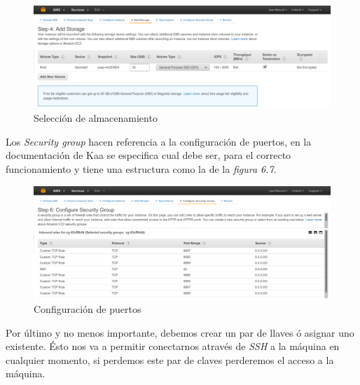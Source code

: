 \begin{figure}[!ht]
  \begin{center}
    \includegraphics[scale=0.30]{../images/kaa/5.png}
		\caption{Selección de almacenamiento}
    \label{fig:kaa}
	\end{center}
\end{figure}

Los \textit{Security group} hacen referencia a la configuración de puertos, en la documentación de Kaa se especifica cual debe ser, para el correcto funcionamiento y tiene una estructura como la de la \textit{ figura 6.7}.

\begin{figure}[!ht]
  \begin{center}
    \includegraphics[scale=0.30]{../images/kaa/6.png}
		\caption{Configuración de puertos}
    \label{fig:kaa}
	\end{center}
\end{figure}

\newpage

Por último y no menos importante, debemos crear un par de llaves ó asignar uno existente. Ésto nos va a permitir conectarnos através de \textit{SSH} a la máquina en cualquier momento, si perdemos este par de claves perderemos el acceso a la máquina.


